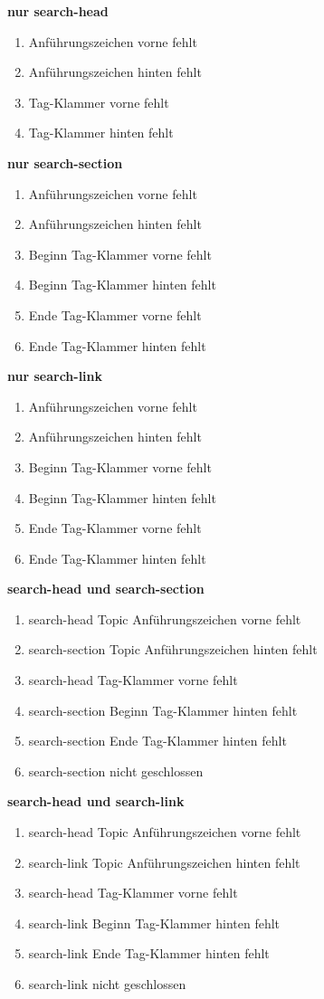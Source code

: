 \textbf{nur search-head}
\begin{enumerate}
\item Anführungszeichen vorne fehlt
\item Anführungszeichen hinten fehlt
\item Tag-Klammer vorne fehlt
\item Tag-Klammer hinten fehlt
\end{enumerate}

\textbf{nur search-section}
\begin{enumerate}
\item Anführungszeichen vorne fehlt
\item Anführungszeichen hinten fehlt
\item Beginn Tag-Klammer vorne fehlt
\item Beginn Tag-Klammer hinten fehlt
\item Ende Tag-Klammer vorne fehlt
\item Ende Tag-Klammer hinten fehlt
\end{enumerate}

\textbf{nur search-link}
\begin{enumerate}
\item Anführungszeichen vorne fehlt
\item Anführungszeichen hinten fehlt
\item Beginn Tag-Klammer vorne fehlt
\item Beginn Tag-Klammer hinten fehlt
\item Ende Tag-Klammer vorne fehlt
\item Ende Tag-Klammer hinten fehlt
\end{enumerate}

\textbf{search-head und search-section} 
\begin{enumerate}
\item search-head Topic Anführungszeichen vorne fehlt
\item search-section Topic Anführungszeichen hinten fehlt
\item search-head Tag-Klammer vorne fehlt
\item search-section Beginn Tag-Klammer hinten fehlt
\item search-section Ende Tag-Klammer hinten fehlt
\item search-section nicht geschlossen
\end{enumerate}

\pagebreak
\textbf{search-head und search-link} 
\begin{enumerate}
\item search-head Topic Anführungszeichen vorne fehlt
\item search-link Topic Anführungszeichen hinten fehlt
\item search-head Tag-Klammer vorne fehlt
\item search-link Beginn Tag-Klammer hinten fehlt
\item search-link Ende Tag-Klammer hinten fehlt
\item search-link nicht geschlossen
\end{enumerate}

